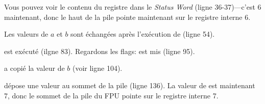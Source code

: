 Vous pouvez voir le contenu du registre  dans le \emph{Status Word} (ligne 36-37)---c'est
6 maintenant, donc le haut de la pile pointe maintenant sur le registre interne 6.

Les valeurs de $a$ et $b$ sont échangées après l'exécution de  (ligne 54).

 est exécuté (ilgne 83).
Regardons les flags: \CF est mis (ligne 95).

 a copié la valeur de $b$ (voir ligne 104).

\FSTP dépose une valeur au sommet de la pile (ligne 136).
La valeur de  est maintenant 7, donc le sommet de la pile du FPU pointe
sur le registre interne 7.

